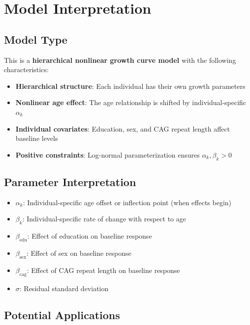 \documentclass[12pt]{article}
\begin{document}
\section{Model Interpretation}

\subsection{Model Type}
This is a \textbf{hierarchical nonlinear growth curve model} with the following characteristics:

\begin{itemize}[leftmargin=*]
    \item \textbf{Hierarchical structure}: Each individual has their own growth parameters
    \item \textbf{Nonlinear age effect}: The age relationship is shifted by individual-specific $\alpha_k$
    \item \textbf{Individual covariates}: Education, sex, and CAG repeat length affect baseline levels
    \item \textbf{Positive constraints}: Log-normal parameterization ensures $\alpha_k, \beta_k > 0$
\end{itemize}

\subsection{Parameter Interpretation}

\begin{itemize}[leftmargin=*]
    \item $\alpha_k$: Individual-specific age offset or inflection point (when effects begin)
    \item $\beta_k$: Individual-specific rate of change with respect to age
    \item $\beta_{\text{edu}}$: Effect of education on baseline response
    \item $\beta_{\text{sex}}$: Effect of sex on baseline response  
    \item $\beta_{\text{cag}}$: Effect of CAG repeat length on baseline response
    \item $\sigma$: Residual standard deviation
\end{itemize}

\subsection{Potential Applications}
\end{document}
